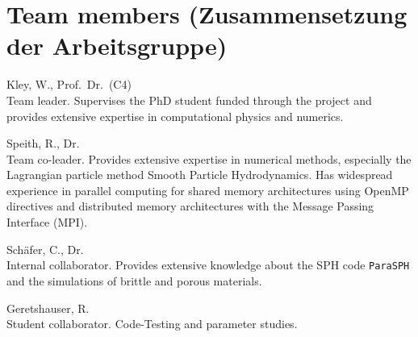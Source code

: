 \section{Team members (Zusammensetzung der Arbeitsgruppe)}
%
%
\begin{teamlist}
\item[Kley, W., Prof.~Dr.~(C4)]\mbox{}\\
Team leader. Supervises the PhD student funded through the project and
provides extensive expertise in computational physics and numerics.
\item[Speith, R., Dr.]\mbox{}\\
Team co-leader. Provides extensive expertise in numerical methods,
especially the Lagrangian particle method Smooth Particle
Hydrodynamics. Has widespread experience in parallel computing for
shared memory architectures using OpenMP directives and distributed
memory architectures with the Message Passing Interface (MPI).
\item[Sch\"afer, C., Dr.]\mbox{}\\
Internal collaborator. Provides extensive knowledge about the
SPH code {\tt ParaSPH} and the simulations of brittle and porous
materials.
\item[Geretshauser, R.]\mbox{}\\
Student collaborator. Code-Testing and parameter studies.
\end{teamlist}
